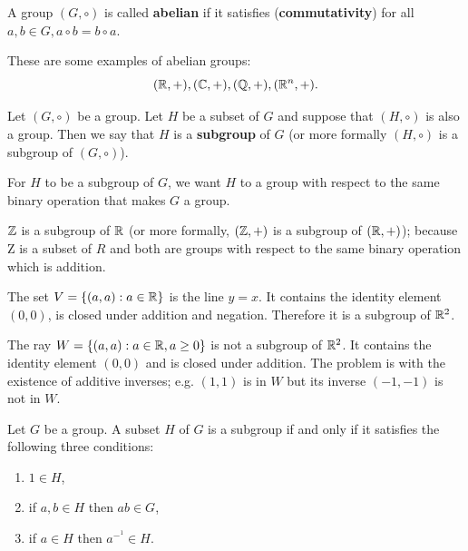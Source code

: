 \documentclass[12pt]{book}
\begin{document}
\begin{defi}\label{def:group2}
      A group $(G,\circ)$ is called \textbf{abelian} if it satisfies (\textbf{commutativity}) for all $a, b \in G, a \circ b = b \circ a$.
\end{defi}

\begin{examp}\label{exp:group3}
      These are some examples of abelian groups: 
	  $$(\mathbb{R},+), (\mathbb{C},+), (\mathbb{Q},+), (\mathbb{R}^n,+).$$
\end{examp}
\begin{defi}\label{def:group3}
      Let $(G,\circ)$ be a group. Let $H$ be a subset of $G$ and suppose that $(H,\circ)$ is also a group. Then we say that $H$ is a 
	  \textbf{subgroup} of $G$ (or more formally $(H,\circ)$ is a subgroup of $(G,\circ)$). 
\end{defi}	  
For $H$ to be a subgroup of $G$, we want $H$ to a group with respect to the same binary operation that makes $G$ a group.

\begin{examp}\label{exp:group4}
      $\mathbb{Z}$ is a subgroup of $\mathbb{R}$ (or more formally, $(\mathbb{Z},+)$ is a subgroup of $(\mathbb{R},+)$); because Z is a subset of $R$ and both are
	  groups with respect to the same binary operation which is addition.
\end{examp}

\begin{examp}\label{exp:group5}
      The set $V = \{(a,a) : a \in \mathbb{R} \}$ is the line $y = x$. It contains the identity element $(0, 0)$, is closed under addition
      and negation. Therefore it is a subgroup of $\mathbb{R}^2$.
\end{examp}

\begin{examp}\label{exp:group6}
      The ray $W = \{(a,a) : a \in \mathbb{R}, a \geq 0 \}$ is not a subgroup of $\mathbb{R}^2$. It contains the identity element $(0,0)$ and
      is closed under addition. The problem is with the existence of additive inverses; e.g. $(1,1)$ is in $W$ but its inverse
      $(-1,-1)$ is not in $W$.
\end{examp}

\begin{lem}\label{lem:sizefiniteset}
      Let $G$ be a group. A subset $H$ of $G$ is a subgroup if and only if it satisfies the following three conditions:
      \begin{enumerate}
	        \item $1 \in H$,
		 	\item if $a, b \in H$ then $ab \in G$,
		 	\item if $a \in H$ then $a^-^1 \in H$.
	   \end{enumerate}
\end{lem}
	 
\end{document}
